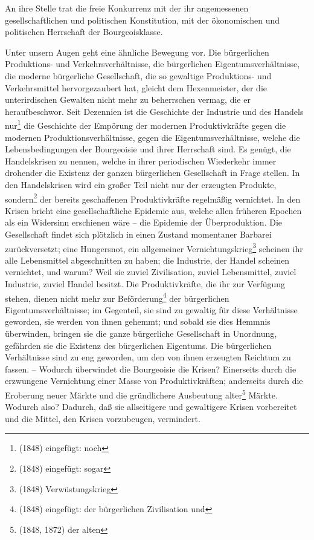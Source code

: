 \documentclass[letterpaper]{article}
\begin{document}
An ihre Stelle trat die freie Konkurrenz mit der ihr angemessenen gesellschaftlichen und politischen Konstitution, mit der ökonomischen und politischen Herrschaft der Bourgeoisklasse.

Unter unsern Augen geht eine ähnliche Bewegung vor. Die bürgerlichen Produktions- und Verkehrsverhältnisse, die bürgerlichen Eigentumsverhältnisse, die moderne bürgerliche Gesellschaft, die so gewaltige Produktions- und Verkehrsmittel hervorgezaubert hat, gleicht dem Hexenmeister, der die unterirdischen Gewalten nicht mehr zu beherrschen vermag, die er heraufbeschwor. Seit Dezennien ist die Geschichte der Industrie und des Handels nur\footnote{(1848) eingefügt: noch} die Geschichte der Empörung der modernen Produktivkräfte gegen die modernen Produktionsverhältnisse, gegen die Eigentumsverhältnisse, welche die Lebensbedingungen der Bourgeoisie und ihrer Herrschaft sind. Es genügt, die Handelskrisen zu nennen, welche in ihrer periodischen Wiederkehr immer drohender die Existenz der ganzen bürgerlichen Gesellschaft in Frage stellen. In den Handelskrisen wird ein großer Teil nicht nur der erzeugten Produkte, sondern\footnote{(1848) eingefügt: sogar} der bereits geschaffenen Produktivkräfte regelmäßig vernichtet. In den Krisen bricht eine gesellschaftliche Epidemie aus, welche allen früheren Epochen als ein Widersinn erschienen wäre – die Epidemie der Überproduktion. Die Gesellschaft findet sich plötzlich in einen Zustand momentaner Barbarei zurückversetzt; eine Hungersnot, ein allgemeiner Vernichtungskrieg\footnote{(1848) Verwüstungskrieg} scheinen ihr alle Lebensmittel abgeschnitten zu haben; die Industrie, der Handel scheinen vernichtet, und warum? Weil sie zuviel Zivilisation, zuviel Lebensmittel, zuviel Industrie, zuviel Handel besitzt. Die Produktivkräfte, die ihr zur Verfügung stehen, dienen nicht mehr zur Beförderung\footnote{(1848) eingefügt: der bürgerlichen Zivilisation und} der bürgerlichen Eigentumsverhältnisse; im Gegenteil, sie sind zu gewaltig für diese Verhältnisse geworden, sie werden von ihnen gehemmt; und sobald sie dies Hemmnis überwinden, bringen sie die ganze bürgerliche Gesellschaft in Unordnung, gefährden sie die Existenz des bürgerlichen Eigentums. Die bürgerlichen Verhältnisse sind zu eng geworden, um den von ihnen erzeugten Reichtum zu fassen. – Wodurch überwindet die Bourgeoisie die Krisen? Einerseits durch die erzwungene Vernichtung einer Masse von Produktivkräften; anderseits durch die Eroberung neuer Märkte und die gründlichere Ausbeutung alter\footnote{(1848, 1872) der alten} Märkte. Wodurch also? Dadurch, daß sie allseitigere und gewaltigere Krisen vorbereitet und die Mittel, den Krisen vorzubeugen, vermindert.
\end{document}
